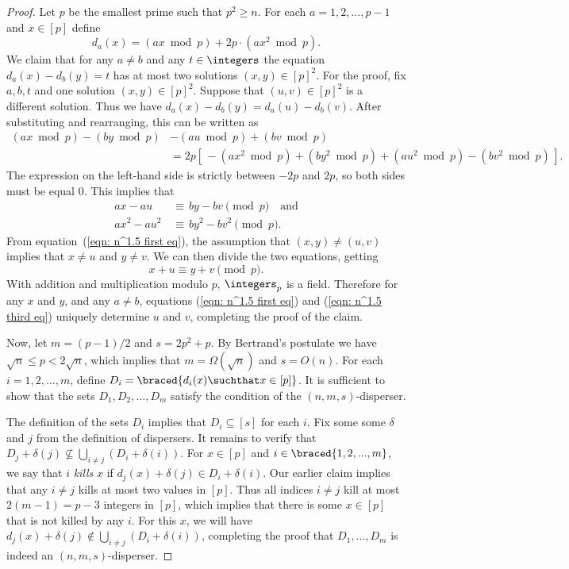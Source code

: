 \begin{proof}
Let $p$ be the smallest prime such that $p^2 \ge n$. 
For each $a = 1,2,...,p-1$ and $x \in [p]$ define
\begin{equation*}
	d_a(x) = (ax \bmod{p}) + 2p\cdot(ax^2 \bmod{p}).
\end{equation*}
We claim that for any $a\neq b$ and any $t\in\integers$ the equation 
$d_a(x) - d_b(y) = t$ has at most two solutions $(x,y)\in [p]^2$.
For the proof, fix $a,b,t$ and one solution $(x,y)\in [p]^2$. Suppose that
$(u,v)\in [p]^2$ is a different solution. Thus we have
$d_a(x) - d_b(y) = d_a(u) - d_b(v)$. After substituting and 
rearranging, this can be written as
\begin{align*}
(ax\bmod{p}) - (by\bmod{p}) &- (au\bmod{p}) + (bv \bmod{p})
\\
			&= 2p[\,-(ax^2\bmod{p}) + (by^2\bmod{p}) + (au^2\bmod{p}) - (bv^2\bmod{p}) \,].
\end{align*}
The expression on the left-hand side is strictly between $-2p$ and $2p$, so
both sides must be equal $0$. This implies that
\begin{align}
ax-au \,&\equiv\, by-bv \pmod{p}
				\quad\textrm{and}
				\label{eqn: n^1.5 first eq}
		\\
ax^2 - au^2 \,&\equiv\, by^2-bv^2 \pmod{p}.
				\label{eqn: n^1.5 second eq}
\end{align}
From equation~(\ref{eqn: n^1.5 first eq}), the assumption that
$(x,y)\neq (u,v)$ implies that $x\neq u$ and $y\neq v$.
We can then divide the two equations, getting
\begin{equation}
x+u \equiv y+v \pmod{p}.
				\label{eqn: n^1.5 third eq}
\end{equation}
With addition and multiplication modulo $p$, $\integers_p$ is a field. Therefore 
for any $x$ and $y$, and any $a \neq b$, equations (\ref{eqn: n^1.5 first eq}) and (\ref{eqn: n^1.5 third eq})
uniquely determine $u$ and $v$, completing the proof of the claim.

\smallskip

Now, let $m = (p-1)/2$ and $s = 2p^2+p$. 
By Bertrand's postulate we have $\sqrt{n}\le p < 2\sqrt{n}$, which implies
that $m = \Omega(\sqrt{n})$ and $s = O(n)$.
For each $i = 1,2,...,m$, define $D_i = \braced{ d_i(x) \suchthat x\in[p]}$. 
It is sufficient to show that the sets $D_1,D_2,...,D_m$ satisfy the
condition of the $(n,m,s)$-disperser. 

The definition of the sets $D_i$ implies that $D_i\subseteq [s]$ for each $i$.
Fix some some $\delta$ and $j$ from the definition of dispersers. It remains to
verify that $D_j + \delta(j) \not\subseteq \bigcup_{i\neq j} (D_i + \delta(i))$.
For $x\in [p]$ and $i\in\braced{1,2,...,m}$, we say that $i$ \emph{kills} $x$
if $d_j(x) + \delta(j) \in D_i+\delta(i)$.
Our earlier claim implies that any $i\neq j$ kills at most two values in $[p]$.
Thus all indices $i\neq j$ kill at most $2(m-1) = p-3$ integers in
$[p]$, which implies that there is some $x\in[p]$ that is not killed by 
any $i$. For this $x$, we will have
$d_j(x) + \delta(j) \notin \bigcup_{i\neq j} (D_i + \delta(i))$,
completing the proof that $D_1,...,D_m$ is indeed an $(n,m,s)$-disperser.
\end{proof}


